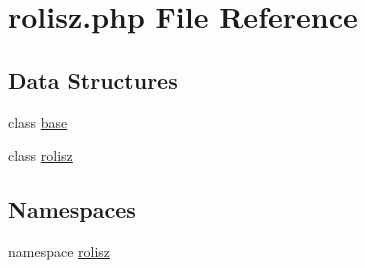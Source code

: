\hypertarget{rolisz_8php}{
\section{rolisz.php File Reference}
\label{rolisz_8php}
}
\subsection*{Data Structures}
\begin{DoxyCompactItemize}
\item 
class \hyperlink{classbase}{base}
\item 
class \hyperlink{classrolisz}{rolisz}
\end{DoxyCompactItemize}
\subsection*{Namespaces}
\begin{DoxyCompactItemize}
\item 
namespace \hyperlink{namespacerolisz}{rolisz}
\end{DoxyCompactItemize}
